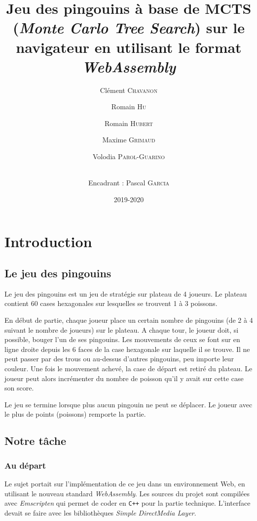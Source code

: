 \documentclass[a4paper,11pt]{article}
\title{\textbf{Jeu des pingouins à base de MCTS (\emph{Monte Carlo Tree
Search}) sur le navigateur en utilisant le format \emph{WebAssembly}}}
\author{Clément \textsc{Chavanon} \and Romain \textsc{Hu} \and Romain
\textsc{Hubert} \and Maxime \textsc{Grimaud} \and Volodia
\textsc{Parol-Guarino} \and 
 \\ Encadrant : Pascal \textsc{Garcia}}
\date{2019-2020}
\begin{document}
\maketitle
\begin{abstract}

\end{abstract}

\hypertarget{introduction}{%
\section*{Introduction}\label{introduction}}

\hypertarget{le-jeu-des-pingouins}{%
\subsection{Le jeu des pingouins}\label{le-jeu-des-pingouins}}

Le jeu des pingouins est un jeu de stratégie sur plateau de 4 joueurs.
Le plateau contient 60 cases hexagonales sur lesquelles se trouvent 1 à
3 poissons.

En début de partie, chaque joueur place un certain nombre de pingouins
(de 2 à 4 suivant le nombre de joueurs) sur le plateau. A chaque tour,
le joueur doit, si possible, bouger l'un de ses pingouins. Les
mouvements de ceux se font sur en ligne droite depuis les 6 faces de la
case hexagonale sur laquelle il se trouve. Il ne peut passer par des
trous ou au-dessus d'autres pingouins, peu importe leur couleur. Une
fois le mouvement achevé, la case de départ est retiré du plateau. Le
joueur peut alors incrémenter du nombre de poisson qu'il y avait sur
cette case son score.

Le jeu se termine lorsque plus aucun pingouin ne peut se déplacer. Le
joueur avec le plus de points (poissons) remporte la partie.

\hypertarget{notre-tuxe2che}{%
\subsection{Notre tâche}\label{notre-tuxe2che}}

\hypertarget{au-duxe9part}{%
\subsubsection{Au départ}\label{au-duxe9part}}

Le sujet portait sur l'implémentation de ce jeu dans un environnement
Web, en utilisant le nouveau standard \emph{WebAssembly}. Les sources du
projet sont compilées avec \emph{Emscripten} qui permet de coder en
\texttt{C++} pour la partie technique. L'interface devait se faire avec
les bibliothèques \emph{Simple DirectMedia Layer}.
\end{document}
